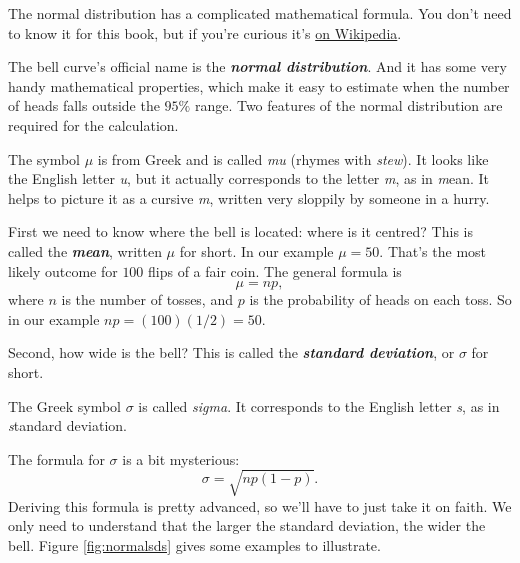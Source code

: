 \documentclass[justified]{tufte-book}
\theoremstyle{definition}
\theoremstyle{definition}
\theoremstyle{definition}
\theoremstyle{definition}
\theoremstyle{remark}
\begin{document}
\begin{marginfigure}
The normal distribution has a complicated mathematical formula. You
don't need to know it for this book, but if you're curious it's
\href{https://en.wikipedia.org/wiki/Normal_distribution}{on Wikipedia}.
\end{marginfigure}

The bell curve's official name is the \textbf{\emph{normal distribution}}. And it has some very handy mathematical properties, which make it easy to estimate when the number of heads falls outside the \(95\%\) range. Two features of the normal distribution are required for the calculation.

\begin{marginfigure}
The symbol \(\mu\) is from Greek and is called \emph{mu} (rhymes with
\emph{stew}). It looks like the English letter \emph{u}, but it actually
corresponds to the letter \emph{m}, as in \emph{m}ean. It helps to
picture it as a cursive \emph{m}, written very sloppily by someone in a
hurry.
\end{marginfigure}

First we need to know where the bell is located: where is it centred? This is called the \textbf{\emph{mean}}, written \(\mu\) for short. In our example \(\mu = 50\). That's the most likely outcome for \(100\) flips of a fair coin. The general formula is
\[ \mu = np, \]
where \(n\) is the number of tosses, and \(p\) is the probability of heads on each toss. So in our example \(np = (100)(1/2) = 50\).

Second, how wide is the bell? This is called the \textbf{\emph{standard deviation}}, or \(\sigma\) for short.

\begin{marginfigure}
The Greek symbol \(\sigma\) is called \emph{sigma}. It corresponds to
the English letter \emph{s}, as in \emph{s}tandard deviation.
\end{marginfigure}

The formula for \(\sigma\) is a bit mysterious:
\[ \sigma = \sqrt{np(1-p)}. \]
Deriving this formula is pretty advanced, so we'll have to just take it on faith. We only need to understand that the larger the standard deviation, the wider the bell. Figure \ref{fig:normalsds} gives some examples to illustrate.
\end{document}
